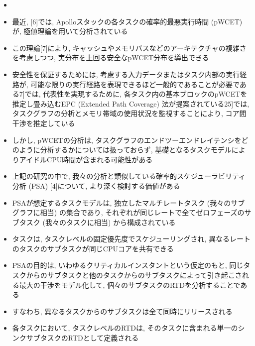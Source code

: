 \begin{frame}{}
    \begin{itemize}
        \item 
\item 最近, [6]では, Apolloスタックの各タスクの確率的最悪実行時間 (pWCET) が, 極値理論を用いて分析されている
\item この理論[7]により, キャッシュやメモリバスなどのアーキテクチャの複雑さを考慮しつつ, 実分布を上回る安全なpWCET分布を導出できる
\item 安全性を保証するためには, 考慮する入力データまたはタスク内部の実行経路が, 可能な限りの実行経路を表現できるほど一般的であることが必要である7]では, 代表性を実現するために, 各タスク内の基本ブロックのpWCETを推定し畳み込むEPC (Extended Path Coverage) 法が提案されている25]では, タスクグラフの分析とメモリ帯域の使用状況を監視することにより, コア間干渉を推定している
\item しかし, pWCETの分析は, タスクグラフのエンドツーエンドレイテンシをどのように分析するかについては扱っておらず, 基礎となるタスクモデルによりアイドルCPU時間が含まれる可能性がある
    \end{itemize}
\end{frame}

\begin{frame}{}
    \begin{itemize}
        \item 上記の研究の中で, 我々の分析と類似している確率的スケジューラビリティ分析 (PSA) [4]について, より深く検討する価値がある
\item PSAが想定するタスクモデルは, 独立したマルチレートタスク (我々のサブグラフに相当) の集合であり, それぞれが同じレートで全てゼロフェーズのサブタスク (我々のタスクに相当) から構成されている
\item タスクは, タスクレベルの固定優先度でスケジューリングされ, 異なるレートのタスクのサブタスクが同じCPUコアを共有できる
\item PSAの目的は, いわゆるクリティカルインスタントという仮定のもと, 同じタスクからのサブタスクと他のタスクからのサブタスクによって引き起こされる最大の干渉をモデル化して, 個々のサブタスクのRTDを分析することである
\item すなわち, 異なるタスクからのサブタスクは全て同時にリリースされる
\item 各タスクにおいて, タスクレベルのRTDは, そのタスクに含まれる単一のシンクサブタスクのRTDとして定義される
    \end{itemize}
\end{frame}

